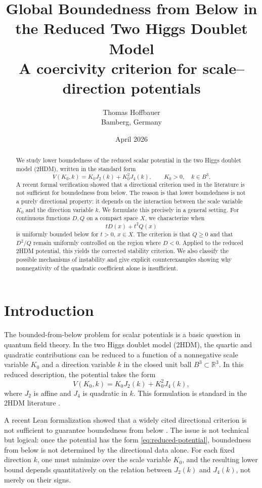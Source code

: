 \documentclass[11pt,a4paper]{article}
\title{\textbf{Global Boundedness from Below in the Reduced Two Higgs Doublet Model}\\[0.4em]
\large A coercivity criterion for scale--direction potentials}
\author{Thomas Hoffbauer\\Bamberg, Germany}
\date{April 2026}
\theoremstyle{definition}
\theoremstyle{remark}
\begin{document}
\maketitle

\begin{abstract}
We study lower boundedness of the reduced scalar potential in the two Higgs doublet model (2HDM), written in the standard form
\[
V(K_0,k)=K_0J_2(k)+K_0^2J_4(k),
\qquad K_0>0,\quad k\in B^3.
\]
A recent formal verification showed that a directional criterion used in the literature is not sufficient for boundedness from below. The reason is that lower boundedness is not a purely directional property: it depends on the interaction between the scale variable $K_0$ and the direction variable $k$. We formulate this precisely in a general setting. For continuous functions $D,Q$ on a compact space $X$, we characterize when
\[
tD(x)+t^2Q(x)
\]
is uniformly bounded below for $t>0$, $x\in X$. The criterion is that $Q\ge 0$ and that $D^2/Q$ remain uniformly controlled on the region where $D<0$. Applied to the reduced 2HDM potential, this yields the corrected stability criterion. We also classify the possible mechanisms of instability and give explicit counterexamples showing why nonnegativity of the quadratic coefficient alone is insufficient.
\end{abstract}

\section{Introduction}

The bounded-from-below problem for scalar potentials is a basic question in quantum field theory. In the two Higgs doublet model (2HDM), the quartic and quadratic contributions can be reduced to a function of a nonnegative scale variable $K_0$ and a direction variable $k$ in the closed unit ball $B^3\subset\mathbb{R}^3$. In this reduced description, the potential takes the form
\begin{equation}\label{eq:reduced-potential}
V(K_0,k)=K_0J_2(k)+K_0^2J_4(k),
\end{equation}
where $J_2$ is affine and $J_4$ is quadratic in $k$. This formulation is standard in the 2HDM literature \citep{Maniatis2006,ToobySmith2026}.

A recent Lean formalization showed that a widely cited directional criterion is not sufficient to guarantee boundedness from below \citep{ToobySmith2026}. The issue is not technical but logical: once the potential has the form \eqref{eq:reduced-potential}, boundedness from below is not determined by the directional data alone. For each fixed direction $k$, one must minimize over the scale variable $K_0$, and the resulting lower bound depends quantitatively on the relation between $J_2(k)$ and $J_4(k)$, not merely on their signs.
\end{document}
